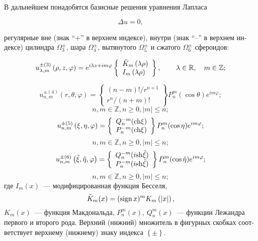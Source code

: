 \begin{russian}
В дальнейшем понадобятся базисные решения уравнения Лапласа

\begin{equation}
\Delta u = 0,
\end{equation}

\noindent регулярные вне (знак ``+'' в верхнем индексе), внутри (знак ``--'' в верхнем индексе) цилиндра $\Omega _3^ \pm$, шара $\Omega _4^ \pm$, вытянутого $\Omega _5^ \pm $ и сжатого $\Omega _6^ \pm $ сфероидов:

\begin{equation}\label{eq:1:4}
u_{\lambda ,m}^{ \pm (3)}\left( {\rho ,z,\varphi } \right) = {e^{i\lambda z + im\varphi }}\left\{ \begin{array}{l}
{{\tilde K}_m}\left( {\lambda \rho } \right)\\
{I_m}\left( {\lambda \rho } \right)
\end{array} \right\},\qquad {\kern 1pt} \lambda  \in \mathbb{R},\quad m \in \mathbb{Z};
\end{equation}

\begin{equation}\label{eq:1:5}
u_{n,m}^{ \pm (4)}\left( {r,\theta ,\varphi } \right) = \left\{ \begin{array}{l}
(n - m)!/{r^{n + 1}}\\
{r^n}/(n + m)!
\end{array} \right\}P_n^m(\cos \theta ){e^{im\varphi }};
\end{equation}
$$
n,m \in \mathbb{Z}, n\ge 0, |m| \le n;
$$
\begin{equation}\label{eq:1:6}
u_{n,m}^{ \pm (5)}\left( {\xi ,\eta ,\varphi } \right) = \left\{ \begin{array}{l}
Q_n^{ - m}({\mathop{\rm ch}\nolimits} \xi )\\
P_n^{ - m}({\mathop{\rm ch}\nolimits} \xi )
\end{array} \right\}P_n^m(\cos \eta ){e^{im\varphi }};
\end{equation}
$$
n,m \in \mathbb{Z}, n\ge 0, |m| \le n;
$$
\begin{equation}\label{eq:1:7}
u_{n,m}^{ \pm (6)}\left( {\tilde \xi ,\tilde \eta ,\varphi } \right) = \left\{ \begin{array}{l}
Q_n^{ - m}(i{\mathop{\rm sh}\nolimits} \tilde \xi )\\
P_n^{ - m}(i{\mathop{\rm sh}\nolimits} \tilde \xi )
\end{array} \right\}P_n^m(\cos \tilde \eta ){e^{im\varphi }};
\end{equation}
$$
n,m \in \mathbb{Z}, n\ge 0, |m| \le n;
$$
\noindent где ${I_m}(x)$~--- модифицированная функция Бесселя, $${\tilde K_m}(x) = {({\rm{sign}}{\mkern 1mu} {\kern 1pt} x)^m}{K_m}\left( {|x|} \right),$$
${K_m}(x)$~--- функция Макдональда, $P_n^m(x)$, $Q_n^m(x)$~--- функции Лежандра первого и второго рода. Верхний (нижний) множитель в фигурных скобках соответствует верхнему (нижнему) знаку индекса $\left\{  \pm  \right\}$.


\end{russian}

